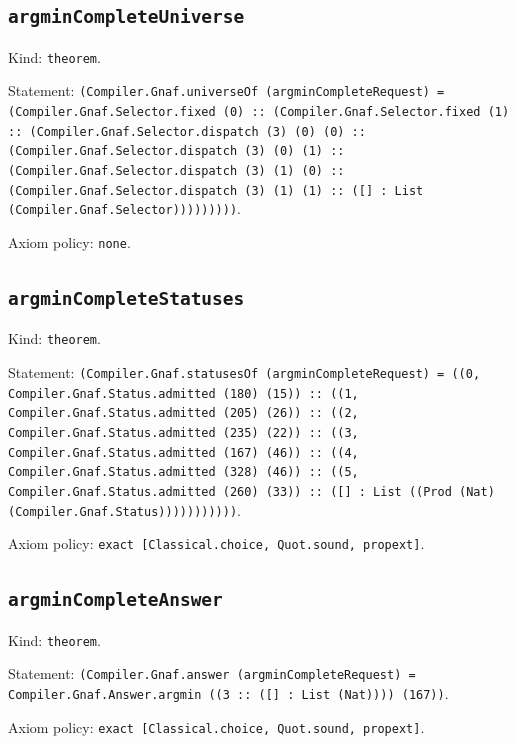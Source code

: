 \documentclass[11pt]{article}
\begin{document}
\subsection*{\texttt{argminCompleteUniverse}}
\noindent Kind: \texttt{theorem}.\par
\noindent Statement: \texttt{(Compiler.Gnaf.universeOf (argminCompleteRequest) = (Compiler.Gnaf.Selector.fixed (0) :: (Compiler.Gnaf.Selector.fixed (1) :: (Compiler.Gnaf.Selector.dispatch (3) (0) (0) :: (Compiler.Gnaf.Selector.dispatch (3) (0) (1) :: (Compiler.Gnaf.Selector.dispatch (3) (1) (0) :: (Compiler.Gnaf.Selector.dispatch (3) (1) (1) :: ([] : List (Compiler.Gnaf.Selector)))))))))}.\par
\noindent Axiom policy: \texttt{none}.\par
\subsection*{\texttt{argminCompleteStatuses}}
\noindent Kind: \texttt{theorem}.\par
\noindent Statement: \texttt{(Compiler.Gnaf.statusesOf (argminCompleteRequest) = ((0, Compiler.Gnaf.Status.admitted (180) (15)) :: ((1, Compiler.Gnaf.Status.admitted (205) (26)) :: ((2, Compiler.Gnaf.Status.admitted (235) (22)) :: ((3, Compiler.Gnaf.Status.admitted (167) (46)) :: ((4, Compiler.Gnaf.Status.admitted (328) (46)) :: ((5, Compiler.Gnaf.Status.admitted (260) (33)) :: ([] : List ((Prod (Nat) (Compiler.Gnaf.Status)))))))))))}.\par
\noindent Axiom policy: \texttt{exact [Classical.choice, Quot.sound, propext]}.\par
\subsection*{\texttt{argminCompleteAnswer}}
\noindent Kind: \texttt{theorem}.\par
\noindent Statement: \texttt{(Compiler.Gnaf.answer (argminCompleteRequest) = Compiler.Gnaf.Answer.argmin ((3 :: ([] : List (Nat)))) (167))}.\par
\noindent Axiom policy: \texttt{exact [Classical.choice, Quot.sound, propext]}.\par
\end{document}
